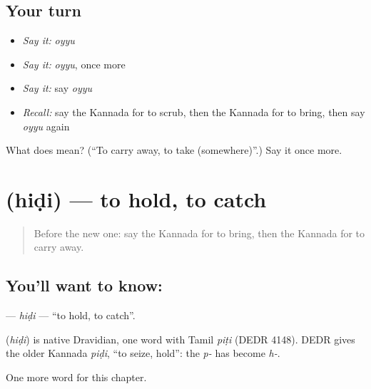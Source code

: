 \subsection*{Your turn}
\begin{itemize}
\raggedright
  \item \emph{Say it:} \emph{oyyu}
  \item \emph{Say it:} \emph{oyyu}, once more
  \item \emph{Say it:} say \emph{oyyu}
  \item \emph{Recall:} say the Kannada for to scrub, then the Kannada for to bring, then say \emph{oyyu} again
\end{itemize}

\begin{tcolorbox}[breakable,colback=teal!4,colframe=teal!35!black,title={Before you move on}]
What does  mean? (\textquotedblleft{}To carry away, to take (somewhere)\textquotedblright{}.) Say it once more.
\end{tcolorbox}
\section[\texorpdfstring{\kn{ಹಿಡಿ} (hiḍi)}{ಹಿಡಿ (hiḍi)}]{ (hiḍi) — to hold, to catch}

\label{lesson:KA-C198-hidi}



\begin{quote}
Before the new one: say the Kannada for to bring, then the Kannada for to carry away.
\end{quote}

\subsection*{You'll want to know: }
\textbf{} — \emph{hiḍi} — \textquotedblleft{}to hold, to catch\textquotedblright{}.

\begin{cousinweb}
\textbf{} (\emph{hiḍi}) is native Dravidian, one word with Tamil \emph{piṭi} (DEDR 4148). DEDR gives the older Kannada \emph{piḍi}, \textquotedblleft{}to seize, hold\textquotedblright{}: the \emph{p-} has become \emph{h-}.
\end{cousinweb}

\begin{grammarlens}[title={What you've built}]
One more word for this chapter.
\end{grammarlens}

